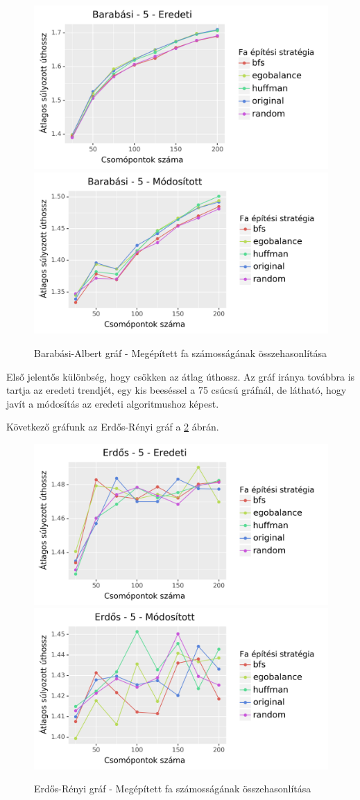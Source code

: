 \documentclass[12pt]{report}
\begin{document}
\begin{figure}[H]
	\begin{center}
		\includegraphics[width=0.49\linewidth]{pictures/barabasi_len_e.png}
		\includegraphics[width=0.49\linewidth]{pictures/barabasi_len_m.png}
		\caption{Barabási-Albert gráf - Megépített fa számosságának összehasonlítása}
		\label{barabasi-tree-difference-len}
	\end{center}
\end{figure}

Első jelentős különbség, hogy csökken az átlag úthossz.
Az gráf iránya továbbra is tartja az eredeti trendjét, egy kis beeséssel a 75 csúcsú gráfnál, de látható, hogy javít a módosítás az eredeti algoritmushoz képest.

Következő gráfunk az Erdős-Rényi gráf a \ref{erdos-tree-difference-len} ábrán.

\begin{figure}[H]
	\begin{center}
		\includegraphics[width=0.49\linewidth]{pictures/erdos_len_e.png}
		\includegraphics[width=0.49\linewidth]{pictures/erdos_len_m.png}
		\caption{Erdős-Rényi gráf - Megépített fa számosságának összehasonlítása}
		\label{erdos-tree-difference-len}
	\end{center}
\end{figure}
\end{document}
